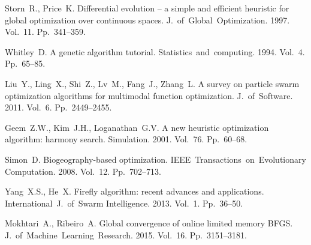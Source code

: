 %

\begin{thebibliography}{9} %

 Storn~R., Price~K. Differential evolution -- a simple and efficient heuristic for global optimization over continuous spaces. J.~of~Global~Optimization. 1997. Vol.~11. Pp.~341--359.

 Whitley~D. A genetic algorithm tutorial. Statistics~and~computing. 1994. Vol.~4. Pp.~65--85.

 Liu~Y., Ling~X., Shi~Z., Lv~M., Fang~J., Zhang~L. A survey on particle swarm optimization algorithms for multimodal function optimization. J.~of~Software. 2011. Vol.~6. Pp.~2449--2455.

 Geem~Z.W., Kim~J.H., Loganathan~G.V. A new heuristic optimization algorithm: harmony search. Simulation. 2001. Vol.~76. Pp.~60--68.

 Simon~D. Biogeography-based optimization. IEEE~Transactions~on~Evolutionary Computation. 2008. Vol.~12. Pp.~702--713.

 Yang~X.S., He~X. Firefly algorithm: recent advances and applications. International~J.~of~Swarm Intelligence. 2013. Vol.~1. Pp.~36--50.

 Mokhtari~A., Ribeiro~A. Global convergence of online limited memory BFGS. J.~of~Machine~Learning~Research. 2015. Vol.~16. Pp.~3151--3181.

\end{thebibliography}





%

